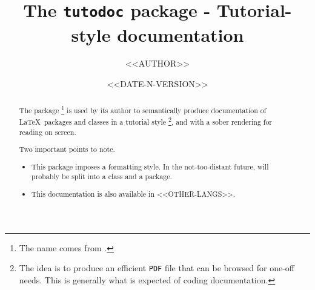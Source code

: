 \documentclass[10pt, a4paper]{article}
\begin{document}
\title{The \texttt{tutodoc} package - Tutorial-style documentation}
\author{<<AUTHOR>>}
\date{<<DATE-N-VERSION>>}

\maketitle

\begin{abstract}
    The \thispack{} package
    \footnote{
        The name comes from .
    }
    is used by its author to semantically produce documentation of \LaTeX\ packages and classes in a tutorial style
    \footnote{
        The idea is to produce an efficient \texttt{PDF} file that can be browsed for one-off needs. This is generally what is expected of coding documentation.
    },
    and with a sober rendering for reading on screen.

    \medskip

    Two important points to note.
    \begin{itemize}
        \item This package imposes a formatting style. In the not-too-distant future, \thispack{} will probably be split into a class and a package.

        \item This documentation is also available in <<OTHER-LANGS>>.
    \end{itemize}
\end{abstract}
\end{document}
